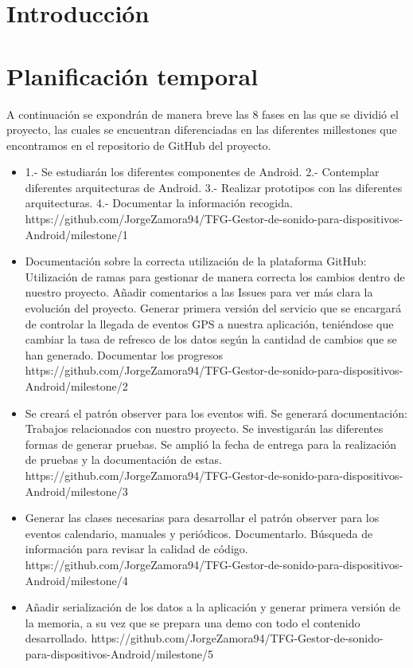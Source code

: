 
\section{Introducción}

\section{Planificación temporal}
A continuación se expondrán de manera breve las 8 fases en las que se dividió el proyecto, las cuales se encuentran diferenciadas en las diferentes millestones que encontramos en el repositorio de GitHub del proyecto.

\begin{itemize}
	\item 1.- Se estudiarán los diferentes componentes de Android. 2.- Contemplar diferentes arquitecturas de Android. 3.- Realizar prototipos con las diferentes arquitecturas. 4.- Documentar la información recogida. https://github.com/JorgeZamora94/TFG-Gestor-de-sonido-para-dispositivos-Android/milestone/1
	\item Documentación sobre la correcta utilización de la plataforma GitHub: Utilización de ramas para gestionar de manera correcta los cambios dentro de nuestro proyecto. Añadir comentarios a las Issues para ver más clara la evolución del proyecto. Generar primera versión del servicio que se encargará de controlar la llegada de eventos GPS a nuestra aplicación, teniéndose que cambiar la tasa de refresco de los datos según la cantidad de cambios que se han generado. Documentar los progresos https://github.com/JorgeZamora94/TFG-Gestor-de-sonido-para-dispositivos-Android/milestone/2
	\item Se creará el patrón observer para los eventos wifi. Se generará documentación: Trabajos relacionados con nuestro proyecto. Se investigarán las diferentes formas de generar pruebas. Se amplió la fecha de entrega para la realización de pruebas y la documentación de estas. https://github.com/JorgeZamora94/TFG-Gestor-de-sonido-para-dispositivos-Android/milestone/3
	\item Generar las clases necesarias para desarrollar el patrón observer para los eventos calendario, manuales y periódicos. Documentarlo. Búsqueda de información para revisar la calidad de código. https://github.com/JorgeZamora94/TFG-Gestor-de-sonido-para-dispositivos-Android/milestone/4
	\item Añadir serialización de los datos a la aplicación y generar primera versión de la memoria, a su vez que se prepara una demo con todo el contenido desarrollado. https://github.com/JorgeZamora94/TFG-Gestor-de-sonido-para-dispositivos-Android/milestone/5

\end{itemize}
